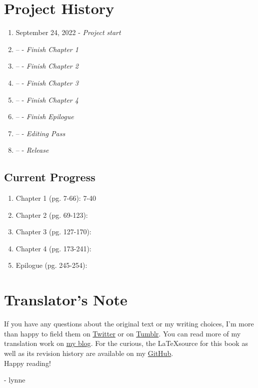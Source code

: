 \section*{Project History}
\begin{enumerate}
	\item September 24, 2022 - \emph{Project start}
	\item -- - \emph{Finish Chapter 1}
	\item -- - \emph{Finish Chapter 2}
	\item -- - \emph{Finish Chapter 3}
	\item -- - \emph{Finish Chapter 4}
	\item -- - \emph{Finish Epilogue}
	\item -- - \emph{Editing Pass}
	\item -- - \emph{Release}
\end{enumerate}
\subsection*{Current Progress}
\begin{enumerate}
	\item Chapter 1 (pg. 7-66): 7-40
	\item Chapter 2 (pg. 69-123):
	\item Chapter 3 (pg. 127-170):
	\item Chapter 4 (pg. 173-241):
	\item Epilogue (pg. 245-254):
\end{enumerate}

\section*{Translator's Note}
If you have any questions about the original text or my writing choices, I'm more than happy to field them on \href{https://twitter.com/plvpwaa}{Twitter} or on \href{https://plvpwaa.tumblr.com}{Tumblr}. You can read more of my translation work on \href{https://lynne.bearblog.dev}{my blog}. For the curious, the \LaTeX \space source for this book as well as its revision history are available on my \href{https://github.com/Spirati/translation-octopath}{GitHub}. 
\\

Happy reading!

- lynne
